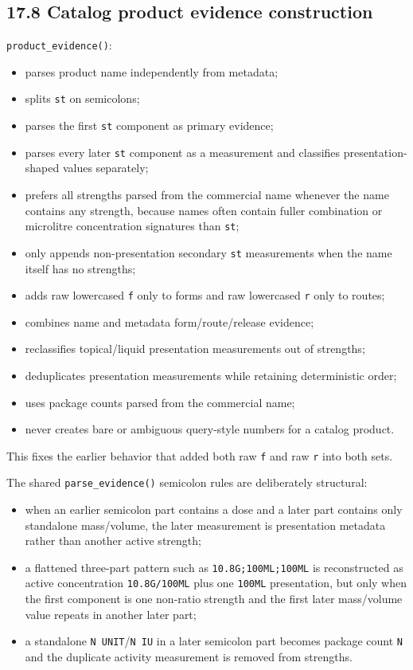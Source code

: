 \subsection{17.8 Catalog product evidence construction}\label{178-catalog-product-evidence-construction}

\texttt{product\_\allowbreak{}evidence()}:

\begin{itemize}
\tightlist
\item
  parses product name independently from metadata;
\item
  splits \texttt{st} on semicolons;
\item
  parses the first \texttt{st} component as primary evidence;
\item
  parses every later \texttt{st} component as a measurement and classifies presentation-shaped values separately;
\item
  prefers all strengths parsed from the commercial name whenever the name contains any strength, because names often contain fuller combination or microlitre concentration signatures than \texttt{st};
\item
  only appends non-presentation secondary \texttt{st} measurements when the name itself has no strengths;
\item
  adds raw lowercased \texttt{f} only to forms and raw lowercased \texttt{r} only to routes;
\item
  combines name and metadata form/route/release evidence;
\item
  reclassifies topical/liquid presentation measurements out of strengths;
\item
  deduplicates presentation measurements while retaining deterministic order;
\item
  uses package counts parsed from the commercial name;
\item
  never creates bare or ambiguous query-style numbers for a catalog product.
\end{itemize}

This fixes the earlier behavior that added both raw \texttt{f} and raw \texttt{r} into both sets.

The shared \texttt{parse\_\allowbreak{}evidence()} semicolon rules are deliberately structural:

\begin{itemize}
\tightlist
\item
  when an earlier semicolon part contains a dose and a later part contains only standalone mass/volume, the later measurement is presentation metadata rather than another active strength;
\item
  a flattened three-part pattern such as \texttt{10.8G;100ML;100ML} is reconstructed as active concentration \texttt{10.8G/100ML} plus one \texttt{100ML} presentation, but only when the first component is one non-ratio strength and the first later mass/volume value repeats in another later part;
\item
  a standalone \texttt{N\ UNIT}/\texttt{N\ IU} in a later semicolon part becomes package count \texttt{N} and the duplicate activity measurement is removed from strengths.
\end{itemize}


